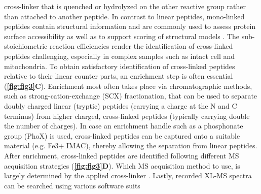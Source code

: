 cross-linker that is quenched or hydrolyzed on the other reactive group rather than attached to another peptide. In contrast to linear peptides, mono-linked peptides contain structural information and are commonly used to assess protein surface accessibility as well as to support scoring of structural models \cite{Sinnott_2020}. The sub-stoichiometric reaction efficiencies render the identification of cross-linked peptides challenging, especially in complex samples such as intact cell and mitochondria. To obtain satisfactory identification of cross-linked peptides relative to their linear counter parts, an enrichment step is often essential (\textbf{\autoref{fig:fig3}C}). Enrichment most often takes place via chromatographic methods, such as strong-cation-exchange (SCX) fractionation, that can be used to separate doubly charged linear (tryptic) peptides (carrying a charge at the N and C terminus) from higher charged, cross-linked peptides (typically carrying double the number of charges). In case an enrichment handle such as a phosphonate group (PhoX) is used, cross-linked peptides can be captured onto a suitable material (e.g. Fe3+ IMAC), thereby allowing the separation from linear peptides. After enrichment, cross-linked peptides are identified following different MS acquisition strategies (\textbf{\autoref{fig:fig3}D}). Which MS acquisition method to use, is largely determined by the applied cross-linker \cite{Liu_2017a}. Lastly, recorded XL-MS spectra can be searched using various software suits
